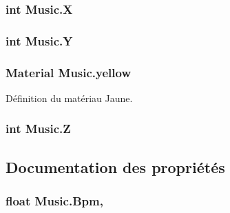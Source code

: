 \subsubsection[{X}]{\setlength{\rightskip}{0pt plus 5cm}int Music.\+X\hspace{0.3cm}{\ttfamily [private]}}\label{class_music_acb9bb6d52e75b11d305be2a2ae180cb5}
\hypertarget{class_music_af45a2d376fdee07df8fc263f17e940b5}{}
\subsubsection[{Y}]{\setlength{\rightskip}{0pt plus 5cm}int Music.\+Y\hspace{0.3cm}{\ttfamily [private]}}\label{class_music_af45a2d376fdee07df8fc263f17e940b5}
\hypertarget{class_music_acf7deb58e516a37db39d3c9883d6034e}{}
\subsubsection[{yellow}]{\setlength{\rightskip}{0pt plus 5cm}Material Music.\+yellow\hspace{0.3cm}{\ttfamily [private]}}\label{class_music_acf7deb58e516a37db39d3c9883d6034e}


Définition du matériau Jaune. 

\hypertarget{class_music_ac55cf30eb31695f3b6ec7ace7a8abb19}{}
\subsubsection[{Z}]{\setlength{\rightskip}{0pt plus 5cm}int Music.\+Z\hspace{0.3cm}{\ttfamily [private]}}\label{class_music_ac55cf30eb31695f3b6ec7ace7a8abb19}


\subsection{Documentation des propriétés}
\hypertarget{class_music_a215cbe531ec3578d7c5a06305b7e7873}{}
\subsubsection[{Bpm}]{\setlength{\rightskip}{0pt plus 5cm}float Music.\+Bpm\hspace{0.3cm}{\ttfamily [get]}, {\ttfamily [set]}}\label{class_music_a215cbe531ec3578d7c5a06305b7e7873}
\hypertarget{class_music_a20bb244d5d40d5848201077b577b0111}{}
